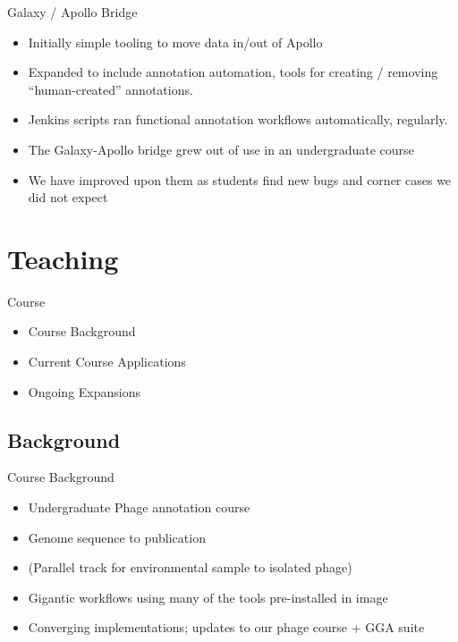\documentclass[12pt]{phage3slides} %
\begin{document}
\begin{frame}{Galaxy / Apollo Bridge}
    \begin{itemize}
        \item Initially simple tooling to move data in/out of Apollo
        \item Expanded to include annotation automation, tools for creating / removing ``human-created'' annotations.
        \item Jenkins scripts ran functional annotation workflows automatically, regularly.
        \item The Galaxy-Apollo bridge grew out of use in an undergraduate course
        \item We have improved upon them as students find new bugs and corner cases we did not expect
    \end{itemize}
\end{frame}









\section{Teaching}
\begin{frame}{Course}
    \begin{itemize}
        \item Course Background
        \item Current Course Applications
        \item Ongoing Expansions
    \end{itemize}
\end{frame}

\subsection{Background}
\begin{frame}{Course Background}
    \begin{itemize}
        \item Undergraduate Phage annotation course
        \item Genome sequence to publication
        \item (Parallel track for environmental sample to isolated phage)
        \item Gigantic workflows using many of the tools pre-installed in image
        \item Converging implementations; updates to our phage course + GGA suite
    \end{itemize}
\end{frame}
\end{document}
